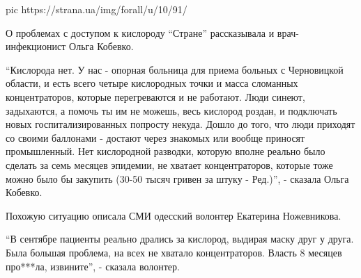 
\ifcmt
pic https://strana.ua/img/forall/u/10/91/%
\fi

О проблемах с доступом к кислороду \enquote{Стране} рассказывала и врач-инфекционист
Ольга Кобевко. 

\enquote{Кислорода нет. У нас - опорная больница для приема больных с Черновицкой
области, и есть всего четыре кислородных точки и масса сломанных
концентраторов, которые перегреваются и не работают. Люди синеют, задыхаются, а
помочь ты им не можешь, весь кислород роздан, и подключать новых
госпитализированных попросту некуда. Дошло до того, что люди приходят со своими
баллонами - достают через знакомых или вообще приносят промышленный. Нет
кислородной разводки, которую вполне реально было сделать за семь месяцев
эпидемии, не хватает концентраторов, которые тоже можно было бы закупить (30-50
тысяч гривен за штуку - Ред.)}, - сказала Ольга Кобевко.

Похожую ситуацию описала СМИ одесский волонтер Екатерина Ножевникова.

\enquote{В сентябре пациенты реально дрались за кислород, выдирая маску друг у друга.
Была большая проблема, на всех не хватало концентраторов. Власть 8 месяцев
про***ла, извините}, - сказала волонтер.  
